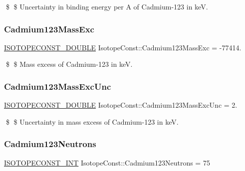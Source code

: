 \$ \$ Uncertainty in binding energy per A of Cadmium-\/123 in keV. \mbox{\label{group___isotope_const-_cadmium-_cd123_gaed08770065fd674dfc8f8435b1de6938}} 
\subsubsection{\texorpdfstring{Cadmium123\+Mass\+Exc}{Cadmium123MassExc}}
{\footnotesize\ttfamily \mbox{\hyperlink{group___isotope_const-_macros_ga8f45a7272ce02c0b4c65c44636ed719a}{I\+S\+O\+T\+O\+P\+E\+C\+O\+N\+S\+T\+\_\+\+D\+O\+U\+B\+LE}} Isotope\+Const\+::\+Cadmium123\+Mass\+Exc = -\/77414.}

\$ \$ Mass excess of Cadmium-\/123 in keV. \mbox{\label{group___isotope_const-_cadmium-_cd123_gaf98375641bffeb3b1177daa3f74dc82a}} 
\subsubsection{\texorpdfstring{Cadmium123\+Mass\+Exc\+Unc}{Cadmium123MassExcUnc}}
{\footnotesize\ttfamily \mbox{\hyperlink{group___isotope_const-_macros_ga8f45a7272ce02c0b4c65c44636ed719a}{I\+S\+O\+T\+O\+P\+E\+C\+O\+N\+S\+T\+\_\+\+D\+O\+U\+B\+LE}} Isotope\+Const\+::\+Cadmium123\+Mass\+Exc\+Unc = 2.}

\$ \$ Uncertainty in mass excess of Cadmium-\/123 in keV. \mbox{\label{group___isotope_const-_cadmium-_cd123_gab0da70a93f2d2d70bcf7d78ece872eaf}} 
\subsubsection{\texorpdfstring{Cadmium123\+Neutrons}{Cadmium123Neutrons}}
{\footnotesize\ttfamily \mbox{\hyperlink{group___isotope_const-_macros_ga5f18360b3e99483a35c32d789e62621c}{I\+S\+O\+T\+O\+P\+E\+C\+O\+N\+S\+T\+\_\+\+I\+NT}} Isotope\+Const\+::\+Cadmium123\+Neutrons = 75}

